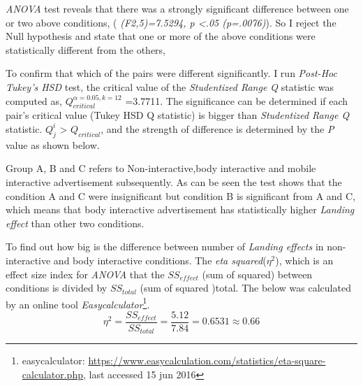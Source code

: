 \emph{ANOVA} test reveals that there was a strongly significant difference between one or two above conditions, ( \emph{(F2,5)=7.5294, p <.05 (p=.0076)}). So I reject the Null hypothesis and state that one or more of the above conditions were statistically different from the others, 

To confirm that which of the pairs were different significantly. I run \emph{Post-Hoc Tukey’s HSD} test, the critical value of the \emph{Studentized Range Q} statistic was computed as, ${Q}_{critical}^{\alpha=0.05,k=12}$ =3.7711. The significance can be determined if each pair’s critical value (Tukey HSD Q statistic) is bigger than \emph{Studentized Range Q} statistic. ${Q}_{j}^{i }$ > ${Q}_{critical}$, and the strength of difference is determined by the \emph{P} value as shown below.

\begin{table}[H]
\caption{Post-Hoc Tukey’s HSD results}
\label{tab:landing-non-posthoctukey}
\centering
{}
\end{table}


Group A, B and C refers to Non-interactive,body interactive and mobile interactive advertisement subsequently. As can be seen the test shows that the condition A and C were insignificant but condition B is significant from A and C, which means that body interactive advertisement has statistically higher \emph{Landing effect} than other two conditions.

To find out how big is the difference between number of \emph{Landing effects} in non-interactive and body interactive conditions. The \emph{eta squared}(${\eta}^2$), which is an effect size index for \emph{ANOVA} that the $SS_{effect}$ (sum of squared) between conditions is divided by $SS_{total}$  (sum of squared )total. The below was calculated by an online tool \emph{Easycalculator}\footnote{easycalculator: \url{https://www.easycalculation.com/statistics/eta-square-calculator.php}, last accessed 15 jun 2016}.
\[
{\eta}^2 = \frac{{SS}_{effect}}{{SS}_{total}} = \frac{5.12}{7.84} = 0.6531 \approx 0.66
\]

